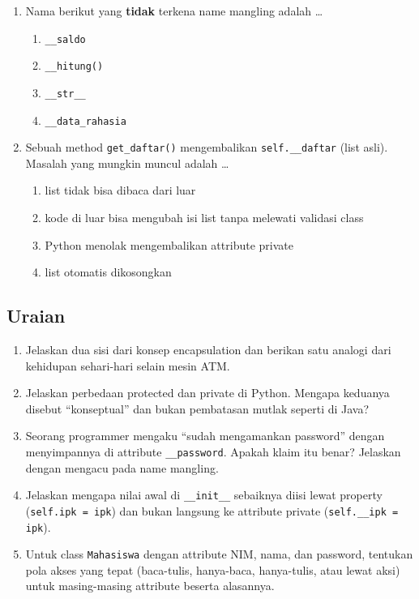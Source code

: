 \begin{enumerate}
  \item Nama berikut yang \textbf{tidak} terkena name mangling adalah \ldots
  \begin{enumerate}[label=\alph*.,itemsep=0pt]
    \item \texttt{\_\_saldo}
    \item \texttt{\_\_hitung()}
    \item \texttt{\_\_str\_\_}
    \item \texttt{\_\_data\_rahasia}
  \end{enumerate}

  \item Sebuah method \texttt{get\_daftar()} mengembalikan \texttt{self.\_\_daftar} (list asli). Masalah yang mungkin muncul adalah \ldots
  \begin{enumerate}[label=\alph*.,itemsep=0pt]
    \item list tidak bisa dibaca dari luar
    \item kode di luar bisa mengubah isi list tanpa melewati validasi class
    \item Python menolak mengembalikan attribute private
    \item list otomatis dikosongkan
  \end{enumerate}
\end{enumerate}

\subsection{Uraian}

\begin{enumerate}
  \item Jelaskan dua sisi dari konsep encapsulation dan berikan satu analogi dari kehidupan sehari-hari selain mesin ATM.
  \item Jelaskan perbedaan protected dan private di Python. Mengapa keduanya disebut ``konseptual'' dan bukan pembatasan mutlak seperti di Java?
  \item Seorang programmer mengaku ``sudah mengamankan password'' dengan menyimpannya di attribute \texttt{\_\_password}. Apakah klaim itu benar? Jelaskan dengan mengacu pada name mangling.
  \item Jelaskan mengapa nilai awal di \texttt{\_\_init\_\_} sebaiknya diisi lewat property (\texttt{self.ipk = ipk}) dan bukan langsung ke attribute private (\texttt{self.\_\_ipk = ipk}).
  \item Untuk class \texttt{Mahasiswa} dengan attribute NIM, nama, dan password, tentukan pola akses yang tepat (baca-tulis, hanya-baca, hanya-tulis, atau lewat aksi) untuk masing-masing attribute beserta alasannya.
\end{enumerate}


